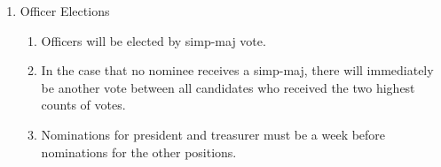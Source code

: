 \begin{enumerate}
		\item Officer Elections
		\begin{enumerate}
			\item Officers will be elected by \gls{simp-maj} vote.

			\item In the case that no nominee receives a \gls{simp-maj}, there will immediately be another vote between all candidates who received the two highest counts of votes.
            \item Nominations for president and treasurer must be a week before nominations for the other positions.
		\end{enumerate}

	\end{enumerate}
